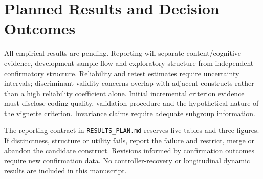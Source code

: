 \section{Planned Results and Decision Outcomes}

All empirical results are pending. Reporting will separate content/cognitive evidence, development sample flow and exploratory structure from independent confirmatory structure. Reliability and retest estimates require uncertainty intervals; discriminant validity concerns overlap with adjacent constructs rather than a high reliability coefficient alone. Initial incremental criterion evidence must disclose coding quality, validation procedure and the hypothetical nature of the vignette criterion. Invariance claims require adequate subgroup information.

The reporting contract in \texttt{RESULTS\_PLAN.md} reserves five tables and three figures. If distinctness, structure or utility fails, report the failure and restrict, merge or abandon the candidate construct. Revisions informed by confirmation outcomes require new confirmation data. No controller-recovery or longitudinal dynamic results are included in this manuscript.
